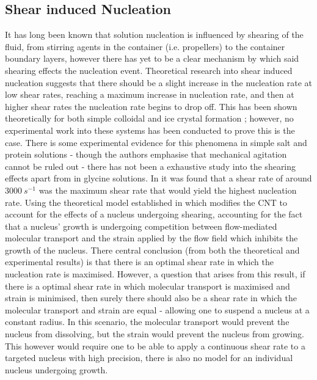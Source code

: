 \subsection{Shear induced Nucleation}
It has long been known that solution nucleation is influenced by shearing 
of the fluid, from stirring agents in the container (i.e. propellers) to 
the container boundary layers, however there has yet to be a clear mechanism 
by which said shearing effects the nucleation event. Theoretical research 
into shear induced nucleation suggests that there should be a slight increase 
in the nucleation rate at low shear rates, reaching a maximum increase in 
nucleation rate, and then at higher shear rates the nucleation rate begins 
to drop off. This has been shown theoretically for both simple colloidal
\cite{Mura2016,Debuysschere2023,Richard2015} and ice crystal formation 
\cite{Goswami2020}; however, no experimental work into these systems has 
been conducted to prove this is the case.  There is some experimental 
evidence for this phenomena in simple salt and protein solutions - though 
the authors emphasise that mechanical agitation cannot be ruled out - 
there has not been a exhaustive study into the shearing effects apart from 
in glycine solutions. In \cite{Debuysschere2023} it was found that a shear 
rate of around $3000\ s^{-1}$ was the maximum shear rate that would yield 
the highest nucleation rate. Using the theoretical model established in 
\cite{Mura2016,2001} which modifies the CNT to account for the effects of 
a nucleus undergoing shearing, accounting for the fact that a nucleus' 
growth is undergoing competition between flow-mediated molecular transport 
and the strain applied by the flow field which inhibits the growth of the 
nucleus. There central conclusion (from both the theoretical and experimental 
results) is that there is an optimal shear rate in which the nucleation 
rate is maximised. However, a question that arises from this result, if 
there is a optimal shear rate in which molecular transport is maximised 
and strain is minimised, then surely there should also be a shear rate 
in which the molecular transport and strain are equal - allowing one to 
suspend a nucleus at a constant radius. In this scenario, the molecular 
transport would prevent the nucleus from dissolving, but the strain would 
prevent the nucleus from growing. This however would require one to be 
able to apply a continuous shear rate to a targeted nucleus with high 
precision, there is also no model for an individual nucleus undergoing growth.

